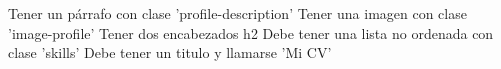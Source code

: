 Tener un párrafo con clase 'profile-description'
Tener una imagen con clase 'image-profile'
Tener dos encabezados h2
Debe tener una lista no ordenada con clase 'skills'
Debe tener un titulo y llamarse 'Mi CV'
